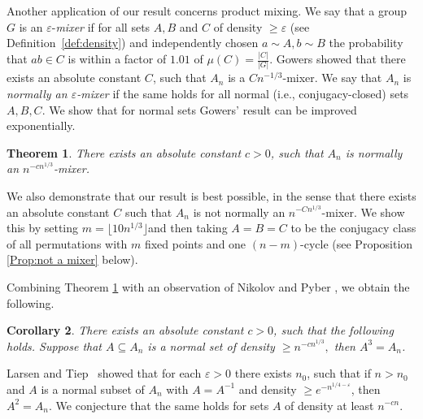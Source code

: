 \documentclass[11pt, letterpaper]{amsart}
\newtheorem{thm}{Theorem}[section]
\newtheorem{cor}[thm]{Corollary}
\newcommand{\remove}[1]{}
\newcommand\eps{\varepsilon}
\renewcommand\ge{\geqslant}
\renewcommand{\epsilon}{\eps}
\begin{document}
Another application of our result concerns product mixing. We say that a group $G$ is an $\epsilon$-\emph{mixer} if for all sets $A,B$ and $C$ of density $\ge \epsilon$ (see Definition~\ref{def:density}) and independently chosen $a\sim A,b\sim B$ the probability that $ab\in C$ is within a factor of $1.01$ of $\mu(C) = \frac{|C|}{|G|}$. Gowers \cite{gowers2008quasirandom} showed that there exists an absolute constant $C$, such that $A_n$ is a $Cn^{-1/3}$-mixer. We say that $A_n$ is \emph{normally an $\epsilon$-mixer} if the same holds for all normal (i.e., conjugacy-closed) sets $A,B,C$.
We show that for normal sets Gowers' result can be improved exponentially.
\begin{thm}\label{thm:normally mixing}
There exists an absolute constant $c>0$, such that $A_n$ is normally an $n^{-cn^{1/3}}$-mixer.
\end{thm}
We also demonstrate that our result is best possible, in the sense that there exists an absolute constant $C$ such that $A_n$ is not normally an $n^{-Cn^{1/3}}$-mixer.
We show this by setting $m = \lfloor 10n^{1/3} \rfloor$and then taking $A=B=C$ to be the conjugacy class of all permutations with $m$ fixed points and one $(n- m)$-cycle (see Proposition \ref{Prop:not a mixer} below). 



\remove{
 What is $C$? I tried $A=B=C$, and I think it fails: The probability that a permutation has exactly $k$ fixed points (up to a factor of $1/e$) is $\frac{\binom{n}{k}\cdot(n-k)!}{n!} = \frac{1}{k!}$ and in our case we get $(n^{n^{1/3}/3})^{-1}$. On the other hand, the probability that two sets of size $n^{1/3}$ will be the same is $\frac{1}{\binom{n}{n^{1/3}}} \approx (n^{2n^{1/3}/3})^{-1}$, which is much smaller. I think that a constant factor (like $10n^{1/3}$ fixed points) will not affect this. Maybe if $C$ requires less fixed points then the freedom in choosing the joint fixed points will give a better result?
}

Combining Theorem \ref{thm:normally mixing} with an observation of Nikolov and Pyber \cite{nikolov2011product}, we obtain the following. 

\begin{cor}\label{cor:Nikolov pyber}
    There exists an absolute constant $c>0$, such that the following holds. Suppose that $A\subseteq A_n$ is a normal set of density  $\ge n^{-cn^{1/3}},$ then $A^3=A_n$.
\end{cor}

Larsen and Tiep~\cite{larsen2023squares} showed that for each $\epsilon>0$ there exists $n_0$, such that if $n>n_0$ and $A$ is a normal subset of $A_n$ with $A=A^{-1}$ and density $\ge e^{-n^{1/4-\epsilon}}$, then $A^2 =A_n.$ We conjecture that the same holds for sets $A$ of density at least $n^{- c n}$.
\end{document}
